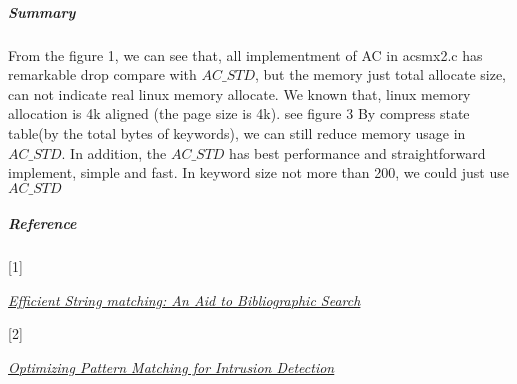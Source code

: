 \documentclass{article}
\begin{document}
\subparagraph{Summary}

From the figure 1, we can see that, all implementment of AC in acsmx2.c has remarkable drop compare with $AC\_STD$, but the memory just total allocate size, can not indicate real linux memory allocate. We known that, linux memory allocation is 4k aligned (the page size is 4k). see figure 3
By compress state table(by the total bytes of keywords), we can still reduce memory usage in $AC\_STD$. In addition, the $AC\_STD$ has best performance and straightforward implement, simple and fast. In keyword size not more than 200, we could just use $AC\_STD$


\subparagraph{Reference}
\begin{list}{}{}
  \item \hypertarget{effic}{[1]} \href{http://cr.yp.to/bib/1975/aho.pdf}{\textit{Efficient String matching: An Aid to Bibliographic Search}} \\
  \item \hypertarget{snort}{[2]} \href{http://citeseerx.ist.psu.edu/viewdoc/download?doi=10.1.1.103.4663&rep=rep1&type=pdf}{\textit{Optimizing Pattern Matching for Intrusion Detection}}
\end{list}
\end{document}
